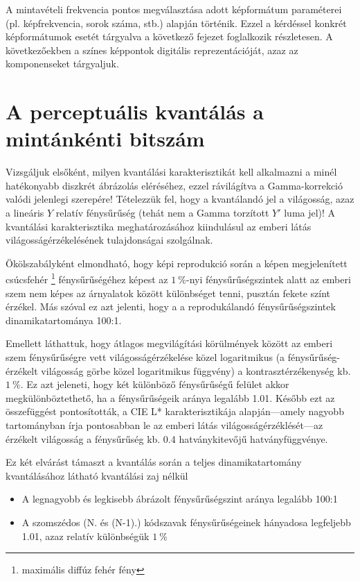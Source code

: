 A mintavételi frekvencia pontos megválasztása adott képformátum paraméterei (pl. képfrekvencia, sorok száma, stb.) alapján történik.
Ezzel a kérdéssel konkrét képformátumok esetét tárgyalva a következő fejezet foglalkozik részletesen.
A következőekben a színes \ypbpr képpontok digitális reprezentációját, azaz az \ycbcr komponenseket tárgyaljuk.

\section{A perceptuális kvantálás a mintánkénti bitszám}
Vizsgáljuk elsőként, milyen kvantálási karakterisztikát kell alkalmazni a minél hatékonyabb diszkrét ábrázolás eléréséhez, ezzel rávilágítva a Gamma-korrekció valódi jelenlegi szerepére!
Tételezzük fel, hogy a kvantálandó jel a világosság, azaz a lineáris $Y$ relatív fénysűrűség (tehát nem a Gamma torzított $Y'$ luma jel)!
A kvantálási karakterisztika meghatározásához kiindulásul az emberi látás világosságérzékelésének tulajdonságai szolgálnak.

Ökölszabályként elmondható, hogy képi reprodukció során a képen megjelenített csúcsfehér \footnote{maximális diffúz fehér fény} fénysűrűségéhez képest az $1~\%$-nyi fénysűrűségszintek alatt az emberi szem nem képes az árnyalatok között különbséget tenni, pusztán fekete színt érzékel.
Más szóval ez azt jelenti, hogy a a reprodukálandó fénysűrűségszintek dinamikatartománya 100:1.

Emellett láthattuk, hogy átlagos megvilágítási körülmények között az emberi szem fénysűrűségre vett világosságérzékelése közel logaritmikus (a fénysűrűség-érzékelt világosság görbe közel logaritmikus függvény) a kontrasztérzékenység kb. $1~\%$.
Ez azt jeleneti, hogy két különböző fénysűrűségű felület akkor megkülönböztethető, ha a fénysűrűségeik aránya legalább 1.01.
Később ezt az összefüggést pontosították, a CIE L* karakterisztikája alapján---amely nagyobb tartományban írja pontosabban le az emberi látás világosságérzéklését---az érzékelt világosság a fénysűrűség kb. 0.4 hatványkitevőjű hatványfüggvénye.

Ez két elvárást támaszt a kvantálás során a teljes dinamikatartomány kvantálásához látható kvantálási zaj nélkül
\begin{itemize}
\item A legnagyobb és legkisebb ábrázolt fénysűrűségszint aránya legalább 100:1
\item A szomszédos (N. és (N-1).) kódszavak fénysűrűségeinek hányadosa legfeljebb 1.01, azaz relatív különbségük $1~\%$
\end{itemize}

